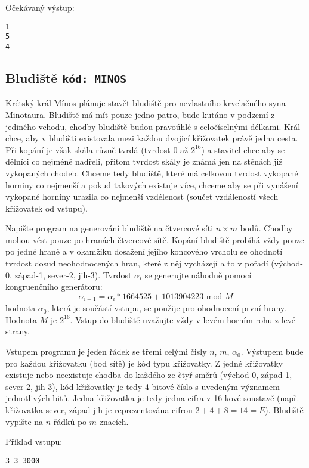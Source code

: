 \documentclass[a4paper,10pt]{article}
\begin{document}
Očekávaný výstup:
\begin{verbatim}
1
5
4
\end{verbatim}




\subsection{Bludiště \hfill{\tt kód: MINOS}}

Krétský král Mínos plánuje stavět bludiště pro nevlastního krvelačného syna Minotaura. Bludiště má mít pouze jedno patro, bude kutáno v podzemí z jediného vchodu, chodby bludiště
budou pravoúhlé s celočíselnými délkami. Král chce, aby v bludišti existovala mezi každou dvojicí křižovatek právě jedna cesta.
Při kopání je však skála různě tvrdá (tvrdost $0$ až $2^{16}$) a stavitel chce aby se dělníci co nejméně nadřeli, přitom tvrdost skály je známá jen na stěnách již 
vykopaných chodeb. Chceme tedy bludiště, které má celkovou tvrdost vykopané horniny co nejmenší a pokud takových existuje více, 
chceme aby se při vynášení vykopané horniny urazila co nejmenší vzdélenost (součet vzdáleností všech křižovatek od vstupu).

Napište program na generování bludiště na čtvercové síti $n \times m$ bodů. Chodby mohou vést pouze po hranách čtvercové sítě. 
Kopání bludiště probíhá vždy pouze po jedné hraně a v okamžiku dosažení jejího koncového vrcholu se ohodnotí tvrdost dosud 
neohodnocených hran, které z něj vycházejí a to v pořadí (východ-0, západ-1, sever-2, jih-3). Tvrdost $\alpha_i$ se generujte náhodně pomocí
kongruenčního generátoru:
\[
    \alpha_{i+1} =  \alpha_i * 1664525 + 1013904223  \text{ mod } M
\]
hodnota $\alpha_0$, která je součástí vstupu, se použije pro ohodnocení první hrany. 
Hodnota $M$ je $2^{16}$.
Vstup do bludiště uvažujte vždy v levém horním rohu z levé strany.

Vstupem programu je jeden řádek se třemi celými čisly $n$, $m$, $\alpha_0$.
Výstupem bude pro každou křižovatku (bod sítě) je kód typu křižovatky. Z jedné křižovatky  existuje nebo neexistuje chodba 
do každého ze čtyř směrů (východ-0, západ-1, sever-2, jih-3), kód křižovatky je tedy 4-bitové číslo s uvedeným významem jednotlivých bitů. Jedna křižovatka je tedy
jedna cifra v 16-kové soustavě (např. křižovatka sever, západ jih je reprezentována cifrou $2+4+8=14=E$). 
Bludiště vypište na $n$ řádků po $m$ znacích.

Příklad vstupu:
\begin{verbatim}
3 3 3000
\end{verbatim}
\end{document}
